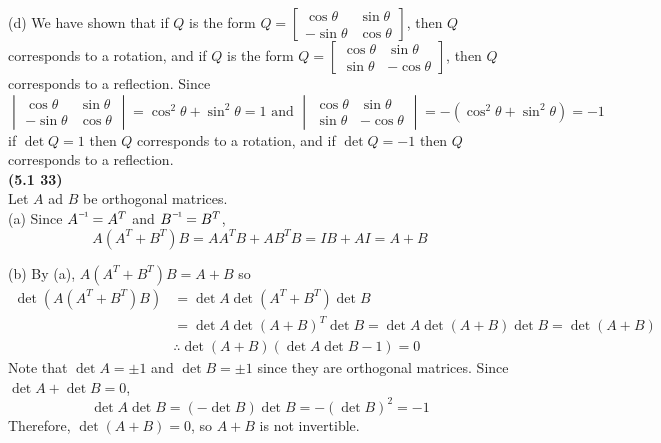 (d) We have shown that if $Q$ is the form $Q = \begin{bmatrix}
	\cos \theta & \sin \theta \\ -\sin \theta & \cos \theta
\end{bmatrix}$, then $Q$ corresponds to a rotation, and if $Q$ is the form $Q = \begin{bmatrix}
	\cos \theta & \sin \theta \\ \sin \theta & -\cos \theta
\end{bmatrix}$, then $Q$ corresponds to a reflection. Since \begin{equation*}
	\begin{vmatrix}
		\cos \theta & \sin \theta \\ -\sin \theta & \cos \theta
	\end{vmatrix} = \cos^2\theta + \sin^2\theta = 1 \mbox{ and } \begin{vmatrix}
		\cos \theta & \sin \theta \\ \sin \theta & -\cos \theta
	\end{vmatrix} = -(\cos^2 \theta + \sin^2\theta) = -1
\end{equation*} if $\det Q = 1$ then $Q$ corresponds to a rotation, and if $\det Q = -1$ then $Q$ corresponds to a reflection. \\

\textbf{(5.1 33)} \\
Let $A$ ad $B$ be orthogonal matrices. \\

(a) Since $\inv{A} = A^T$ and $\inv{B} = B^T$, \begin{equation*}
	A(A^T + B^T)B = AA^TB + AB^TB = IB + AI = A + B
\end{equation*}

(b) By (a), $A(A^T + B^T)B = A+B$ so \begin{align*}
	\det{(A(A^T+B^T)B)} &= \det{A}\det{(A^T + B^T)}\det{B} \\
	&= \det{A}\det{(A+B)^T}\det{B}
	= \det{A}\det{(A+B)}\det{B} = \det{(A+B)} \\
	&\therefore \det{(A+B)}(\det{A}\det{B} - 1) = 0
\end{align*}
Note that $\det{A} = \pm 1$ and $\det{B} = \pm 1$ since they are orthogonal matrices. Since $\det A + \det B = 0$, \begin{equation*}
	\det A \det B = (-\det B)\det B = -(\det B)^2 = -1
\end{equation*} Therefore, $\det{(A+B)} = 0$, so $A+B$ is not invertible. \\

